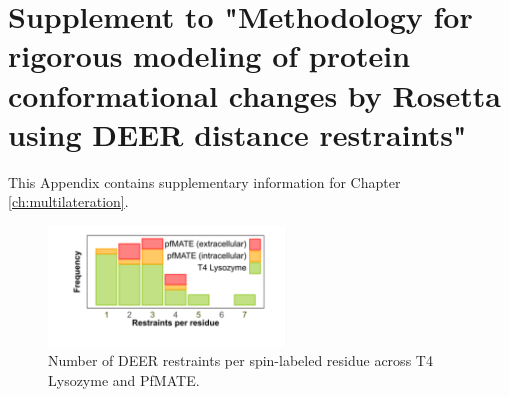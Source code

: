 \clearpage %

\chapter{Supplement to "Methodology for rigorous modeling of protein conformational changes by Rosetta using DEER distance restraints"} \label{app:multilateration_supp}

This Appendix contains supplementary information for Chapter \ref{ch:multilateration}.


\begin{figure}[h]
\centering
\includegraphics[width=2.5in]{Figures/multilateration_supp_n_restraints.pdf}
 \caption[Number of DEER restraints per spin-labeled residue across T4 Lysozyme and PfMATE.]{Number of DEER restraints per spin-labeled residue across T4 Lysozyme and PfMATE.}
\label{fig:multilateration_supp_n_restraints}
\end{figure}

